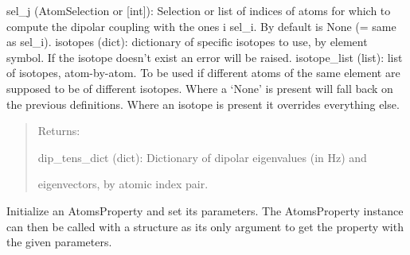 \documentclass[letterpaper,10pt,english]{sphinxmanual}
\begin{document}
\begin{fulllineitems}
\begin{DUlineblock}{0em}
\item[] \textbar{}   sel\_j (AtomSelection or {[}int{]}): Selection or list of indices of atoms
\textbar{}                                   for which to compute the dipolar
\textbar{}                                   coupling with the ones i sel\_i. By
\textbar{}                                   default is None (= same as sel\_i).
\textbar{}   isotopes (dict): dictionary of specific isotopes to use, by element
\textbar{}                    symbol. If the isotope doesn't exist an error will
\textbar{}                    be raised.
\textbar{}   isotope\_list (list): list of isotopes, atom-by-atom. To be used if
\textbar{}                        different atoms of the same element are supposed
\textbar{}                        to be of different isotopes. Where a `None' is
\textbar{}                        present will fall back on the previous
\textbar{}                        definitions. Where an isotope is present it
\textbar{}                        overrides everything else.
\end{DUlineblock}
\begin{quote}

\begin{DUlineblock}{0em}
\item[] Returns: 
\item[]
\begin{DUlineblock}{\DUlineblockindent}
\item[] dip\_tens\_dict (dict): Dictionary of dipolar eigenvalues (in Hz) and
\item[]
\begin{DUlineblock}{\DUlineblockindent}
\item[] eigenvectors, by atomic index pair.
\end{DUlineblock}
\end{DUlineblock}
\end{DUlineblock}
\end{quote}

Initialize an AtomsProperty and set its parameters.
The AtomsProperty instance can then be called with a structure as its
only argument to get the property with the given parameters.


\end{fulllineitems}
\end{document}
